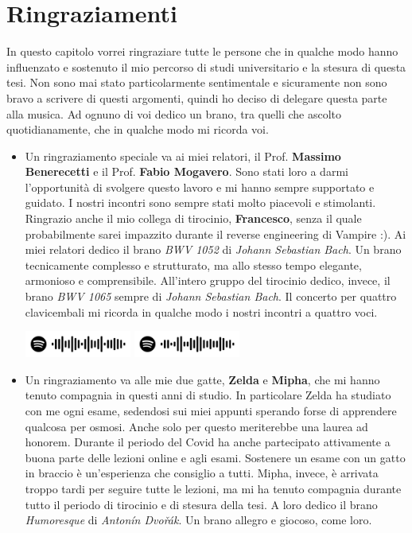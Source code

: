 \documentclass[./main.tex]{subfiles}
\begin{document}
\chapter*{Ringraziamenti}
In questo capitolo vorrei ringraziare tutte le persone che in qualche modo hanno influenzato 
e sostenuto il mio percorso di studi universitario e la stesura di questa tesi.
Non sono mai stato particolarmente sentimentale e sicuramente non sono bravo a scrivere di questi argomenti,
quindi ho deciso di delegare questa parte alla musica. 
Ad ognuno di voi dedico un brano, tra quelli che ascolto quotidianamente, che in qualche modo mi ricorda voi.

\begin{itemize}
    \item Un ringraziamento speciale va ai miei relatori, il Prof. \textbf{Massimo Benerecetti} e il Prof. \textbf{Fabio Mogavero}.
    Sono stati loro a darmi l'opportunità di svolgere questo lavoro e mi hanno sempre supportato e guidato.
    I nostri incontri sono sempre stati molto piacevoli e stimolanti.
    Ringrazio anche il mio collega di tirocinio, \textbf{Francesco}, 
    senza il quale probabilmente sarei impazzito durante il reverse engineering di Vampire :).
    Ai miei relatori dedico il brano \textit{BWV 1052} di \textit{Johann Sebastian Bach}. 
    Un brano tecnicamente complesso e strutturato, ma allo stesso tempo elegante, armonioso e comprensibile.
    All'intero gruppo del tirocinio dedico, invece, il brano \textit{BWV 1065} sempre di \textit{Johann Sebastian Bach}.
    Il concerto per quattro clavicembali mi ricorda in qualche modo i nostri incontri a quattro voci.

    \includegraphics[width=3.5cm]{images/7_ringraziamenti/professori.png}
    \includegraphics[width=3.5cm]{images/7_ringraziamenti/professori2.png}

    \item Un ringraziamento va alle mie due gatte, \textbf{Zelda} e \textbf{Mipha}, che mi hanno tenuto compagnia in questi anni di studio.
    In particolare Zelda ha studiato con me ogni esame, 
    sedendosi sui miei appunti sperando forse di apprendere qualcosa per osmosi.
    Anche solo per questo meriterebbe una laurea ad honorem.
    Durante il periodo del Covid ha anche partecipato attivamente a buona parte delle lezioni online e agli esami.
    Sostenere un esame con un gatto in braccio è un'esperienza che consiglio a tutti.
    Mipha, invece, è arrivata troppo tardi per seguire tutte le lezioni, 
    ma mi ha tenuto compagnia durante tutto il periodo di tirocinio e di stesura della tesi.
    A loro dedico il brano \textit{Humoresque} di \textit{Antonín Dvořák}.
    Un brano allegro e giocoso, come loro.


\end{itemize}
\end{document}
